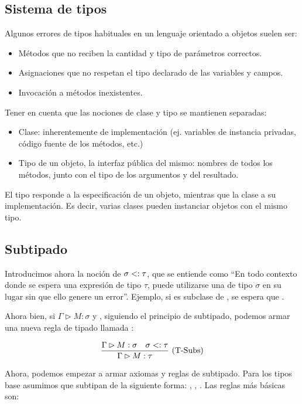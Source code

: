 
\subsection{Sistema de tipos}

Algunos errores de tipos habituales en un lenguaje orientado a objetos suelen ser:
\begin{itemize}
  \item Métodos que no reciben la cantidad y tipo de parámetros correctos.
  \item Asignaciones que no respetan el tipo declarado de las variables y campos.
  \item Invocación a métodos inexistentes.
\end{itemize}

Tener en cuenta que las nociones de clase y tipo se mantienen separadas:
\begin{itemize}
  \item Clase: inherentemente de implementación (ej. variables de instancia privadas, código fuente de los métodos, etc.)
  \item Tipo de un objeto, la interfaz pública del mismo: nombres de todos los métodos, junto con el tipo de los argumentos y del resultado.
\end{itemize}

El tipo responde a la especificación de un objeto, mientras que la clase a su implementación. Es decir, varias clases pueden instanciar objetos con el mismo tipo.

\subsection{Subtipado}

Introducimos ahora la noción de  $\sigma <: \tau$, que se entiende como ``En todo contexto donde se espera una expresión de tipo $\tau$, puede utilizarse una de tipo $\sigma$ en su lugar sin que ello genere un error''. Ejemplo, si  es subclase de , se espera que .

Ahora bien, si $\Gamma \rhd M : \sigma$ y \subt{\sigma}{\tau}, siguiendo el principio de subtipado, podemos armar una nueva regla de tipado llamada :

\[\deriv{\Gamma \rhd M : \sigma\ \ \ \subt{\sigma}{\tau}}{\Gamma \rhd M : \tau}{T-Subs}\]

Ahora, podemos empezar a armar axiomas y reglas de subtipado. Para los tipos base asumimos que subtipan de la siguiente forma: , , . Las reglas más básicas son:

